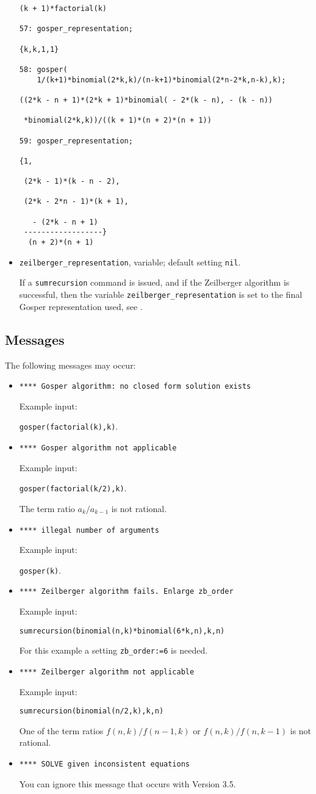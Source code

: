 \begin{itemize}
{\begin{verbatim}
(k + 1)*factorial(k)

57: gosper_representation;

{k,k,1,1}

58: gosper(
    1/(k+1)*binomial(2*k,k)/(n-k+1)*binomial(2*n-2*k,n-k),k);

((2*k - n + 1)*(2*k + 1)*binomial( - 2*(k - n), - (k - n))

 *binomial(2*k,k))/((k + 1)*(n + 2)*(n + 1))

59: gosper_representation;

{1,

 (2*k - 1)*(k - n - 2),

 (2*k - 2*n - 1)*(k + 1),

   - (2*k - n + 1)
 ------------------}
  (n + 2)*(n + 1)
\end{verbatim}
}\noindent
\item
{\tt zeilberger\_representation}, variable; default setting {\tt nil}.

If a {\tt sumrecursion} command is issued, and if the Zeilberger
algorithm is successful, then the variable 
{\tt zeilberger\_representation} is set to the final Gosper
representation used, see \cite{Koornwinder}.
\end{itemize}

\subsection{Messages}

The following messages may occur:
\begin{itemize}
\item
{\tt ***** Gosper algorithm:\ no closed form solution exists}

Example input:

{\tt gosper(factorial(k),k)}.
\item
{\tt ***** Gosper algorithm not applicable}

Example input:

{\tt gosper(factorial(k/2),k)}.

The term ratio $a_k/a_{k-1}$ is not rational.
\item
{\tt ***** illegal number of arguments}

Example input:

{\tt gosper(k)}.
\item
{\tt ***** Zeilberger algorithm fails.\ Enlarge zb\_order}

Example input:

{\tt sumrecursion(binomial(n,k)*binomial(6*k,n),k,n)}

For  this example a setting {\tt zb\_order:=6} is needed.
\item
{\tt ***** Zeilberger algorithm not applicable}

Example input:

{\tt sumrecursion(binomial(n/2,k),k,n)}

One of the term ratios $f(n,k)/f(n-1,k)$ or $f(n,k)/f(n,k-1)$
is not rational.
\item
{\tt ***** SOLVE given inconsistent equations}

You can ignore this message that occurs with Version 3.5.
\end{itemize}

